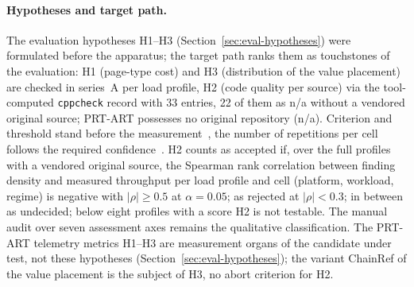 \begin{nurkurz}
\paragraph{Hypotheses and target path.} The evaluation hypotheses H1--H3
(Section~\ref{sec:eval-hypotheses}) were formulated before the apparatus; the target path ranks them as
touchstones of the evaluation: H1 (page-type cost) and H3 (distribution of the value placement) are checked
in series~A per load profile, H2 (code quality per source) via the tool-computed \texttt{cppcheck} record
with 33 entries, 22 of them as n/a without a vendored original source; PRT-ART possesses no original
repository (n/a). Criterion and threshold stand before the measurement~\cite{wohlin2012experimentation},
the number of repetitions per cell follows the required confidence~\cite{kalibera2013rigorous}. H2 counts
as accepted if, over the full profiles with a vendored original source, the Spearman rank correlation
between finding density and measured throughput per load profile and cell (platform, workload, regime) is
negative with $|\rho| \geq 0.5$ at $\alpha = 0.05$; as rejected at $|\rho| < 0.3$; in between as undecided;
below eight profiles with a score H2 is not testable. The manual audit over seven assessment axes remains
the qualitative classification. The PRT-ART telemetry metrics H1--H3 are measurement organs of the
candidate under test, not these hypotheses (Section~\ref{sec:eval-hypotheses}); the variant ChainRef of the
value placement is the subject of H3, no abort criterion for H2.
\end{nurkurz}

